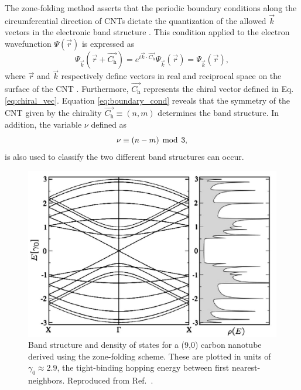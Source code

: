 The zone-folding method asserts that the periodic boundary conditions along the circumferential direction of CNTs dictate the quantization of the allowed $\vec{k}$ vectors in the electronic band structure \cite{charlier2007electronic}. This condition applied to the electron wavefunction $\Psi(\vec{r})$ is expressed as 
\begin{equation}
\Psi_{\vec{k}}(\vec{r} + \vec{C_\text{h}}) = e^{i \vec{k} \cdot \vec{C_\text{h}}} \Psi_{\vec{k}}(\vec{r}) = \Psi_{\vec{k}}(\vec{r}),
\label{eq:boundary_cond}
\end{equation}
where $\vec{r}$ and $\vec{k}$ respectively define vectors in real and reciprocal space on the surface of the CNT \cite{charlier2007electronic}. Furthermore, $\vec{C_\text{h}}$ represents the chiral vector defined in Eq. \ref{eq:chiral_vec}. Equation \ref{eq:boundary_cond} reveals that the symmetry of the CNT given by the chirality $\vec{C_\text{h}} \equiv (n,m)$ determines the band structure. In addition, the variable $\nu$ defined as
%
\begin{equation}
\label{eq:nu_cnt}
\nu \equiv (n-m) \mathrm{\hspace{1.5mm} mod \hspace{1.5mm}} 3,
\end{equation}
%
is also used to classify the two different band structures can occur. 
%
\begin{figure}[h]
	\centering
	\includegraphics[scale=0.36]{images/chapter_optical_props/nine_zero_band_charlier}
	\caption{Band structure and density of states for a (9,0) carbon nanotube derived using the zone-folding scheme. These are plotted in units of $\gamma_0 \approx 2.9$, the tight-binding hopping energy between first nearest-neighbors. Reproduced from Ref.\ \cite{charlier2007electronic}.}
	\label{fig:nine_zero_cnt}
\end{figure}
